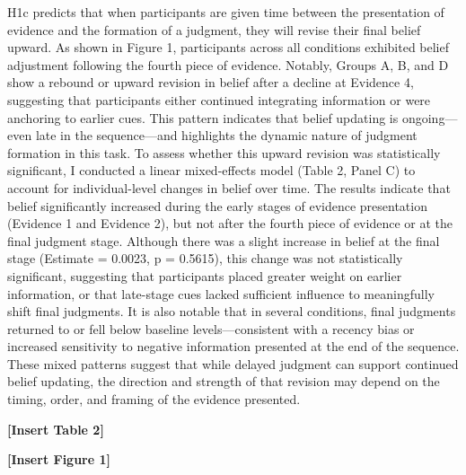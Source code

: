 \documentclass[12pt,english]{article}
\begin{document}
H1c predicts that when participants are given time between the presentation of evidence and the formation of a judgment, they will revise their final belief upward. As shown in Figure 1, participants across all conditions exhibited belief adjustment following the fourth piece of evidence. Notably, Groups A, B, and D show a rebound or upward revision in belief after a decline at Evidence 4, suggesting that participants either continued integrating information or were anchoring to earlier cues. This pattern indicates that belief updating is ongoing—even late in the sequence—and highlights the dynamic nature of judgment formation in this task. To assess whether this upward revision was statistically significant, I conducted a linear mixed-effects model (Table 2, Panel C) to account for individual-level changes in belief over time. The results indicate that belief significantly increased during the early stages of evidence presentation (Evidence 1 and Evidence 2), but not after the fourth piece of evidence or at the final judgment stage. Although there was a slight increase in belief at the final stage (Estimate = 0.0023, p = 0.5615), this change was not statistically significant, suggesting that participants placed greater weight on earlier information, or that late-stage cues lacked sufficient influence to meaningfully shift final judgments. It is also notable that in several conditions, final judgments returned to or fell below baseline levels—consistent with a recency bias or increased sensitivity to negative information presented at the end of the sequence. These mixed patterns suggest that while delayed judgment can support continued belief updating, the direction and strength of that revision may depend on the timing, order, and framing of the evidence presented.

\begin{center}
    \textbf{[Insert Table 2]}
\end{center}

\begin{center}
    \textbf{[Insert Figure 1]}
\end{center}
\end{document}
